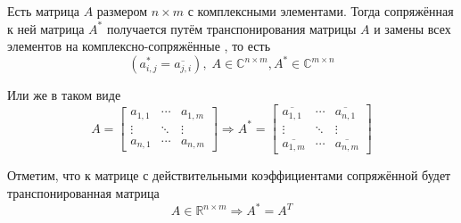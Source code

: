 \begin{definition}
  Есть матрица $A$ размером $n \times m$ с комплексными элементами.
  Тогда сопряжённая к ней матрица $A^*$ получается путём транспонирования
  матрицы $A$ и замены всех элементов на комплексно-сопряжённые
  \cite[с.~243]{VoevodinLA}, то есть
  $$\left( a_{i,j}^* = \overline{a_{j,i}} \right),\;
  A \in \mathbb{C}^{n \times m}, A^* \in \mathbb{C}^{m \times n}$$

  Или же в таком виде
  $$A =
  \begin{bmatrix}
      a_{1,1} & \cdots & a_{1,m} \\
      \vdots & \ddots & \vdots \\
      a_{n,1} & \cdots & a_{n,m}
  \end{bmatrix}
      \Rightarrow
  A^* = 
  \begin{bmatrix}
      \overline{a_{1,1}} & \cdots & \overline{a_{n,1}} \\
      \vdots & \ddots & \vdots \\
      \overline{a_{1,m}} & \cdots & \overline{a_{n,m}}
  \end{bmatrix}$$
\end{definition}

\begin{remark}
  Отметим, что к матрице с действительными коэффициентами сопряжённой будет
  транспонированная матрица
  $$A \in \mathbb{R}^{n \times m} \Rightarrow A^* = A^T$$
\end{remark}


